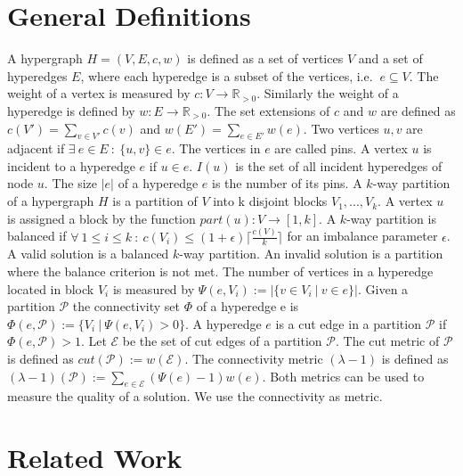 \documentclass[a4paper,12pt,titlepage, BCOR7mm,headsepline]{scrbook}
\numberwithin{equation}{section}
\begin{document}
\section{General Definitions}

A hypergraph $H = (V, E, c, w)$ is defined as a set of vertices $V$ and a set of hyperedges $E$, where each hyperedge is a subset of the vertices, i.e. $\ e \subseteq V$.
The weight of a vertex is measured by $c: V \rightarrow  \mathbb R_{> 0}$. Similarly the weight of a hyperedge is defined by $w: E \rightarrow  \mathbb R_{> 0}$. 
The set extensions of $c$ and $w$ are defined as $c(V') = \sum_{v \in V'} c(v)$ and $w(E') = \sum_{e \in E'} w(e)$. 
Two vertices $u, v$ are adjacent if $\exists\ e \in E\ :\ \{u, v\} \in e$. The vertices in $e$ are called pins. A vertex $u$ is incident to a hyperedge $e$ if $ u \in e$. $I(u)$ is the set of all incident hyperedges of node $u$. The size $|e|$ of a hyperedge $e$ is the number of its pins. A $k$-way partition of a hypergraph $H$ is a partition of $V$ into k disjoint blocks $V_1, ..., V_k$. A vertex $u$ is assigned a block by the function $part(u): V \rightarrow [1, k]$.
A $k$-way partition is balanced if $\forall\  1 \le i \le k\ :\ c(V_i) \le (1 + \epsilon) \lceil \frac{c(V)}{k} \rceil $ for an imbalance parameter $\epsilon$.
A valid solution is a balanced $k$-way partition. An invalid solution is a partition where the balance criterion is not met.
The number of vertices in a hyperedge located in block $V_i$ is measured by $\Psi(e,V_i) := |\{v \in V_i \ |\ v \in e \}|$. Given a partition $\mathcal{P}$ the connectivity set $\Phi$ of a hyperedge e is $\Phi(e, \mathcal{P}) :=  \{V_i\ |\ \Psi(e, V_i) > 0\}$. 
A hyperedge $e$ is a cut edge in a partition $\mathcal{P}$ if $\Phi(e, \mathcal{P}) > 1$. 
Let $\mathcal{E}$ be the set of cut edges of a partition $\mathcal{P}$. The cut metric of $\mathcal{P}$ is defined as $cut(\mathcal{P}) := w(\mathcal{E})$.
The connectivity metric $(\lambda - 1)$ is defined as $(\lambda - 1)(\mathcal{P}) := \sum_{e \in \mathcal{E}}(\Psi(e) - 1)w(e)$.
Both metrics can be used to measure the quality of a solution. We use the connectivity as metric. 





\section{Related Work}
\end{document}
